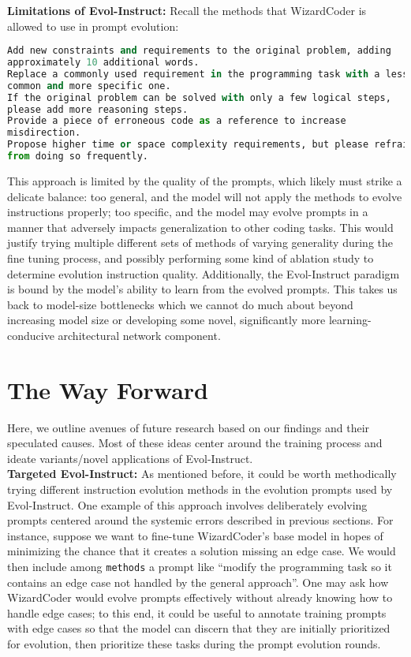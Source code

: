 \documentclass[10pt]{article}
\newcommand{\code}[1]{\texttt{#1}}
\theoremstyle{definition}
\begin{document}
\noindent\textbf{Limitations of Evol-Instruct:} Recall the methods that WizardCoder is allowed to use in prompt evolution:
\begin{lstlisting}[language=Python]
Add new constraints and requirements to the original problem, adding
approximately 10 additional words.
Replace a commonly used requirement in the programming task with a less
common and more specific one.
If the original problem can be solved with only a few logical steps,
please add more reasoning steps.
Provide a piece of erroneous code as a reference to increase
misdirection.
Propose higher time or space complexity requirements, but please refrain
from doing so frequently.
\end{lstlisting}
\noindent This approach is limited by the quality of the prompts, which likely must strike a delicate balance: too general, and the model will not apply the methods to evolve instructions properly; too specific, and the model may evolve prompts in a manner that adversely impacts generalization to other coding tasks. This would justify trying multiple different sets of methods of varying generality during the fine tuning process, and possibly performing some kind of ablation study to determine evolution instruction quality. Additionally, the Evol-Instruct paradigm is bound by the model's ability to learn from the evolved prompts. This takes us back to model-size bottlenecks which we cannot do much about beyond increasing model size or developing some novel, significantly more learning-conducive architectural network component.

\section{The Way Forward}
\noindent Here, we outline avenues of future research based on our findings and their speculated causes. Most of these ideas center around the training process and ideate variants/novel applications of Evol-Instruct.\\

\noindent\textbf{Targeted Evol-Instruct:} As mentioned before, it could be worth methodically trying different instruction evolution methods in the evolution prompts used by Evol-Instruct. One example of this approach involves deliberately evolving prompts centered around the systemic errors described in previous sections. For instance, suppose we want to fine-tune WizardCoder's base model in hopes of minimizing the chance that it creates a solution missing an edge case. We would then include among \code{methods} a prompt like ``modify the programming task so it contains an edge case not handled by the general approach''. One may ask how WizardCoder would evolve prompts effectively without already knowing how to handle edge cases; to this end, it could be useful to annotate training prompts with edge cases so that the model can discern that they are initially prioritized for evolution, then prioritize these tasks during the prompt evolution rounds.\\
\end{document}
